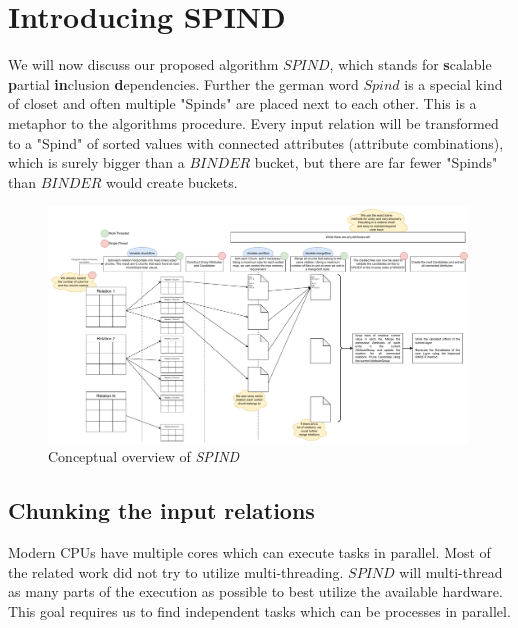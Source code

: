 \section{Introducing SPIND}

We will now discuss our proposed algorithm $SPIND$, which stands for \textbf{s}calable \textbf{p}artial \textbf{in}clusion \textbf{d}ependencies. Further the german word $Spind$ is a special kind of closet and often multiple "Spinds" are placed next to each other. This is a metaphor to the algorithms procedure. Every input relation will be transformed to a "Spind" of sorted values with connected attributes (attribute combinations), which is surely bigger than a $BINDER$ bucket, but there are far fewer "Spinds" than $BINDER$ would create buckets.

\begin{figure}[h]
    \centering
    \includegraphics[width=0.99\textwidth]{files/SPIND.pdf}
    \caption{Conceptual overview of \textit{SPIND}}
    \label{fig:spind}
\end{figure}

\subsection{Chunking the input relations}
Modern CPUs have multiple cores which can execute tasks in parallel. Most of the related work did not try to utilize multi-threading. $SPIND$ will multi-thread as many parts of the execution as possible to best utilize the available hardware. This goal requires us to find independent tasks which can be processes in parallel. \\

